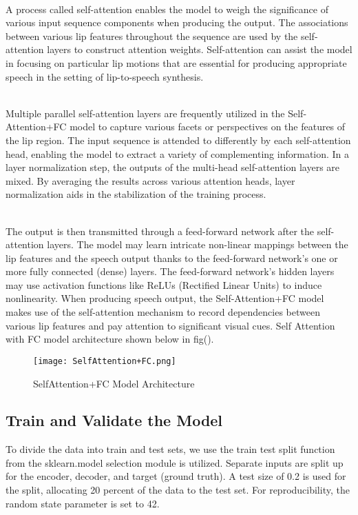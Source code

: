 \documentclass[conference]{IEEEtran}
\begin{document}
\\ A process called self-attention enables the model to weigh the significance of various input sequence components when producing the output.
The associations between various lip features throughout the sequence are used by the self-attention layers to construct attention weights. Self-attention can assist the model in focusing on particular lip motions that are essential for producing appropriate speech in the setting of lip-to-speech synthesis.

\\ Multiple parallel self-attention layers are frequently utilized in the Self-Attention+FC model to capture various facets or perspectives on the features of the lip region. The input sequence is attended to differently by each self-attention head, enabling the model to extract a variety of complementing information. In a layer normalization step, the outputs of the multi-head self-attention layers are mixed. By averaging the results across various attention heads, layer normalization aids in the stabilization of the training process.

\\ The output is then transmitted through a feed-forward network after the self-attention layers. The model may learn intricate non-linear mappings between the lip features and the speech output thanks to the feed-forward network's one or more fully connected (dense) layers. The feed-forward network's hidden layers may use activation functions like ReLUs (Rectified Linear Units) to induce nonlinearity. When producing speech output, the Self-Attention+FC model makes use of the self-attention mechanism to record dependencies between various lip features and pay attention to significant visual cues. Self Attention with FC model architecture shown below in fig().

\begin{figure}[htbp]
\centerline{\texttt{[image: SelfAttention+FC.png]}}
\caption{SelfAttention+FC Model Architecture}
\label{fig}
\end{figure}
\subsection{Train and Validate the Model}
To divide the data into train and test sets, we use the train test split function from the sklearn.model selection module is utilized.
Separate inputs are split up for the encoder, decoder, and target (ground truth). A test size of 0.2 is used for the split, allocating 20 percent of the data to the test set. For reproducibility, the random state parameter is set to 42.
\end{document}
